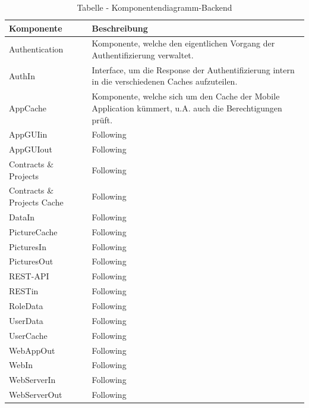 \begin{longtable}{|p{2.5cm}|p{10.0cm}|}
\caption{Tabelle - Komponentendiagramm-Backend}
\label{tab:table_comp_backend} \\
\hline
\textbf{Komponente} & \textbf{Beschreibung} \\ 
\hline
Authentication & Komponente, welche den eigentlichen Vorgang der Authentifizierung verwaltet. \\
\hline
AuthIn & Interface, um die Response der Authentifizierung intern in die verschiedenen Caches aufzuteilen. \\
\hline
AppCache & Komponente, welche sich um den Cache der Mobile Application kümmert, u.A. auch die Berechtigungen prüft. \\
\hline
AppGUIin & Following \\
\hline
AppGUIout & Following \\
\hline
Contracts {\&} Projects & Following \\
\hline
Contracts {\&} Projects Cache & Following \\
\hline
DataIn & Following \\
\hline
PictureCache & Following \\
\hline
PicturesIn & Following \\
\hline
PicturesOut & Following \\
\hline
REST-API & Following \\
\hline
RESTin & Following \\
\hline
RoleData & Following \\
\hline
UserData & Following \\
\hline
UserCache & Following \\
\hline
WebAppOut & Following \\
\hline
WebIn & Following \\
\hline
WebServerIn & Following \\
\hline
WebServerOut & Following \\
\hline
\end{longtable}